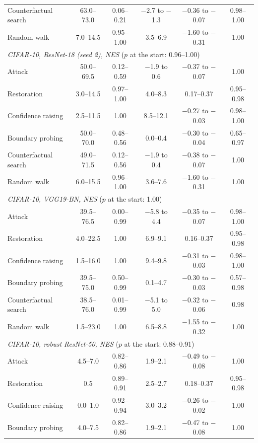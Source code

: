 \begin{footnotesize}
\begin{longtable}{@{\extracolsep{\fill}}lccccc@{}}
\quad Counterfactual search & 63.0--73.0 & 0.06--0.21 & $-$2.7 to $-$1.3 & $-$0.36 to $-$0.07 & 0.98--1.00 \\
\quad Random walk & 7.0--14.5 & 0.95--1.00 & 3.5--6.9 & $-$1.60 to $-$0.31 & 1.00 \\
\multicolumn{6}{l}{\emph{CIFAR-10, ResNet-18 (seed 2), NES} ($p$ at the start: 0.96--1.00)} \\
\quad Attack & 50.0--69.5 & 0.12--0.59 & $-$1.9 to 0.6 & $-$0.37 to $-$0.07 & 1.00 \\
\quad Restoration & 3.0--14.5 & 0.97--1.00 & 4.0--8.3 & 0.17--0.37 & 0.95--0.98 \\
\quad Confidence raising & 2.5--11.5 & 1.00 & 8.5--12.1 & $-$0.27 to $-$0.03 & 0.98--1.00 \\
\quad Boundary probing & 50.0--70.0 & 0.48--0.56 & 0.0--0.4 & $-$0.30 to $-$0.04 & 0.65--0.97 \\
\quad Counterfactual search & 49.0--71.5 & 0.12--0.56 & $-$1.9 to 0.4 & $-$0.38 to $-$0.07 & 1.00 \\
\quad Random walk & 6.0--15.5 & 0.96--1.00 & 3.6--7.6 & $-$1.60 to $-$0.31 & 1.00 \\
\multicolumn{6}{l}{\emph{CIFAR-10, VGG19-BN, NES} ($p$ at the start: 1.00)} \\
\quad Attack & 39.5--76.5 & 0.00--0.99 & $-$5.8 to 4.4 & $-$0.35 to $-$0.07 & 0.98--1.00 \\
\quad Restoration & 4.0--22.5 & 1.00 & 6.9--9.1 & 0.16--0.37 & 0.95--0.98 \\
\quad Confidence raising & 1.5--16.0 & 1.00 & 9.4--9.8 & $-$0.31 to $-$0.03 & 0.98--1.00 \\
\quad Boundary probing & 39.5--75.0 & 0.50--0.99 & 0.1--4.7 & $-$0.30 to $-$0.03 & 0.57--0.98 \\
\quad Counterfactual search & 38.5--76.0 & 0.01--0.99 & $-$5.1 to 5.0 & $-$0.32 to $-$0.06 & 0.98 \\
\quad Random walk & 1.5--23.0 & 1.00 & 6.5--8.8 & $-$1.55 to $-$0.32 & 1.00 \\
\multicolumn{6}{l}{\emph{CIFAR-10, robust ResNet-50, NES} ($p$ at the start: 0.88--0.91)} \\
\quad Attack & 4.5--7.0 & 0.82--0.86 & 1.9--2.1 & $-$0.49 to $-$0.08 & 1.00 \\
\quad Restoration & 0.5 & 0.89--0.91 & 2.5--2.7 & 0.18--0.37 & 0.95--0.98 \\
\quad Confidence raising & 0.0--1.0 & 0.92--0.94 & 3.0--3.2 & $-$0.26 to $-$0.02 & 1.00 \\
\quad Boundary probing & 4.0--7.5 & 0.82--0.86 & 1.9--2.1 & $-$0.47 to $-$0.08 & 1.00 \\

\end{longtable}
\end{footnotesize}
